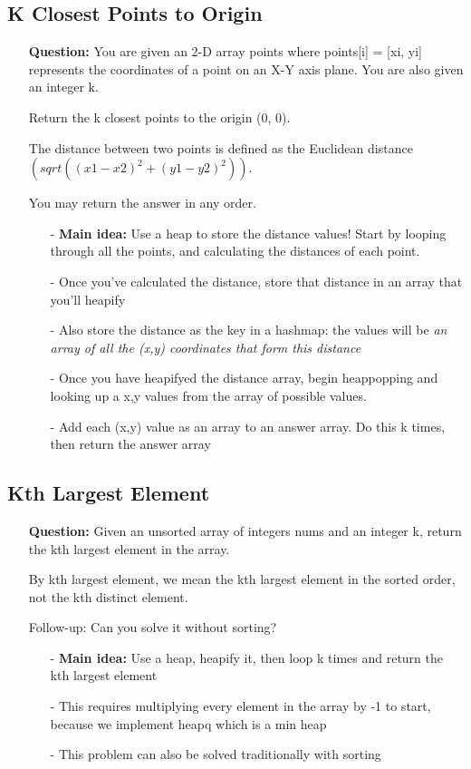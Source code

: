 \documentclass[12pt]{article}
\begin{document}
\subsection{K Closest Points to Origin}
\begin{enumerate}
  \item[] \textbf{Question:} You are given an 2-D array points where points[i] = [xi, yi] represents the coordinates of a point on an X-Y axis plane. You are also given an integer k.

Return the k closest points to the origin (0, 0).

The distance between two points is defined as the Euclidean distance $(sqrt((x1 - x2)^2 + (y1 - y2)^2))$.

You may return the answer in any order.

    \begin{enumerate}
      \item[-] \textbf{Main idea:} Use a heap to store the distance values! Start by looping through all the points, and calculating the distances of each point. 
      \item[-] Once you've calculated the distance, store that distance in an array that you'll heapify
      \item[-] Also store the distance as the key in a hashmap: the values will be \textit{an array of all the (x,y) coordinates that form this distance}
      \item[-] Once you have heapifyed the distance array, begin heappopping and looking up a x,y values from the array of possible values.
      \item[-] Add each (x,y) value as an array to an answer array. Do this k times, then return the answer array
    \end{enumerate}
\end{enumerate}

\subsection{Kth Largest Element}
\begin{enumerate}
  \item[] \textbf{Question:} Given an unsorted array of integers nums and an integer k, return the kth largest element in the array.

By kth largest element, we mean the kth largest element in the sorted order, not the kth distinct element.

Follow-up: Can you solve it without sorting?

    \begin{enumerate}
      \item[-] \textbf{Main idea:} Use a heap, heapify it, then loop k times and return the kth largest element
      \item[-] This requires multiplying every element in the array by -1 to start, because we implement heapq which is a min heap
      \item[-] This problem can also be solved traditionally with sorting
    \end{enumerate}
\end{enumerate}
\end{document}
